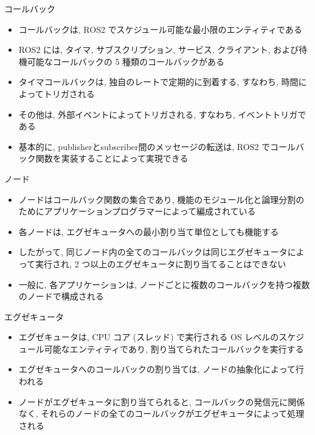 \begin{frame}{コールバック}
    \begin{itemize}
        \item コールバックは, ROS2 でスケジュール可能な最小限のエンティティである
        \item ROS2 には, タイマ, サブスクリプション, サービス, クライアント, および待機可能なコールバックの 5 種類のコールバックがある
        \item タイマコールバックは, 独自のレートで定期的に到着する, すなわち, 時間によってトリガされる
        \item その他は, 外部イベントによってトリガされる, すなわち, イベントトリガである
        \item 基本的に, publisherとsubscriber間のメッセージの転送は, ROS2 でコールバック関数を実装することによって実現できる
    \end{itemize}
\end{frame}

\begin{frame}{ノード}
    \begin{itemize}
        \item ノードはコールバック関数の集合であり, 機能のモジュール化と論理分割のためにアプリケーションプログラマーによって編成されている
        \item 各ノードは, エグゼキュータへの最小割り当て単位としても機能する
        \item したがって, 同じノード内の全てのコールバックは同じエグゼキュータによって実行され, 2 つ以上のエグゼキュータに割り当てることはできない
        \item 一般に, 各アプリケーションは, ノードごとに複数のコールバックを持つ複数のノードで構成される
    \end{itemize}
\end{frame}

\begin{frame}{エグゼキュータ}
    \begin{itemize}
        \item エグゼキュータは, CPU コア (スレッド) で実行される OS レベルのスケジュール可能なエンティティであり, 割り当てられたコールバックを実行する
        \item エグゼキュータへのコールバックの割り当ては, ノードの抽象化によって行われる
        \item ノードがエグゼキュータに割り当てられると, コールバックの発信元に関係なく, それらのノードの全てのコールバックがエグゼキュータによって処理される
    \end{itemize}
\end{frame}

